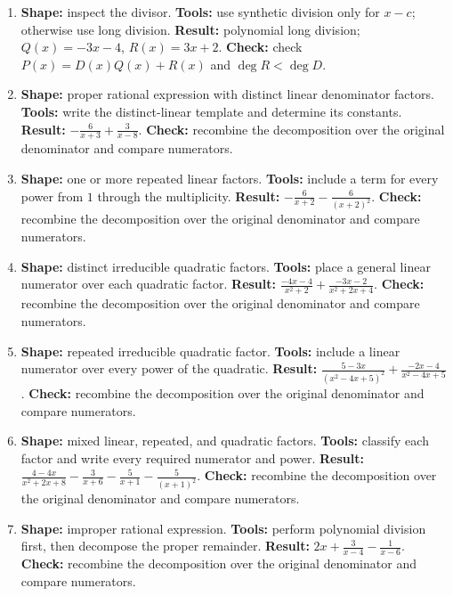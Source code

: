 \documentclass[11pt,oneside]{book}
\begin{document}
\begin{enumerate}[leftmargin=*,label=\textbf{CAP\arabic*.},itemsep=0.45\baselineskip]
\item \textbf{Shape:} inspect the divisor. \textbf{Tools:} use synthetic division only for $x-c$; otherwise use long division. \textbf{Result:} polynomial long division; $Q(x)=- 3 x - 4$, $R(x)=3 x + 2$. \textbf{Check:} check $P(x)=D(x)Q(x)+R(x)$ and $\deg R<\deg D$.
\item \textbf{Shape:} proper rational expression with distinct linear denominator factors. \textbf{Tools:} write the distinct-linear template and determine its constants. \textbf{Result:} $\displaystyle - \frac{6}{x + 3} + \frac{3}{x - 8}$. \textbf{Check:} recombine the decomposition over the original denominator and compare numerators.
\item \textbf{Shape:} one or more repeated linear factors. \textbf{Tools:} include a term for every power from $1$ through the multiplicity. \textbf{Result:} $\displaystyle - \frac{6}{x + 2} - \frac{6}{\left(x + 2\right)^{2}}$. \textbf{Check:} recombine the decomposition over the original denominator and compare numerators.
\item \textbf{Shape:} distinct irreducible quadratic factors. \textbf{Tools:} place a general linear numerator over each quadratic factor. \textbf{Result:} $\displaystyle \frac{- 4 x - 4}{x^{2} + 2} + \frac{- 3 x - 2}{x^{2} + 2 x + 4}$. \textbf{Check:} recombine the decomposition over the original denominator and compare numerators.
\item \textbf{Shape:} repeated irreducible quadratic factor. \textbf{Tools:} include a linear numerator over every power of the quadratic. \textbf{Result:} $\displaystyle \frac{5 - 3 x}{\left(x^{2} - 4 x + 5\right)^{2}} + \frac{- 2 x - 4}{x^{2} - 4 x + 5}$. \textbf{Check:} recombine the decomposition over the original denominator and compare numerators.
\item \textbf{Shape:} mixed linear, repeated, and quadratic factors. \textbf{Tools:} classify each factor and write every required numerator and power. \textbf{Result:} $\displaystyle \frac{4 - 4 x}{x^{2} + 2 x + 8} - \frac{3}{x + 6} - \frac{5}{x + 1} - \frac{5}{\left(x + 1\right)^{2}}$. \textbf{Check:} recombine the decomposition over the original denominator and compare numerators.
\item \textbf{Shape:} improper rational expression. \textbf{Tools:} perform polynomial division first, then decompose the proper remainder. \textbf{Result:} $\displaystyle 2 x + \frac{3}{x - 4} - \frac{1}{x - 6}$. \textbf{Check:} recombine the decomposition over the original denominator and compare numerators.

\end{enumerate}
\end{document}
